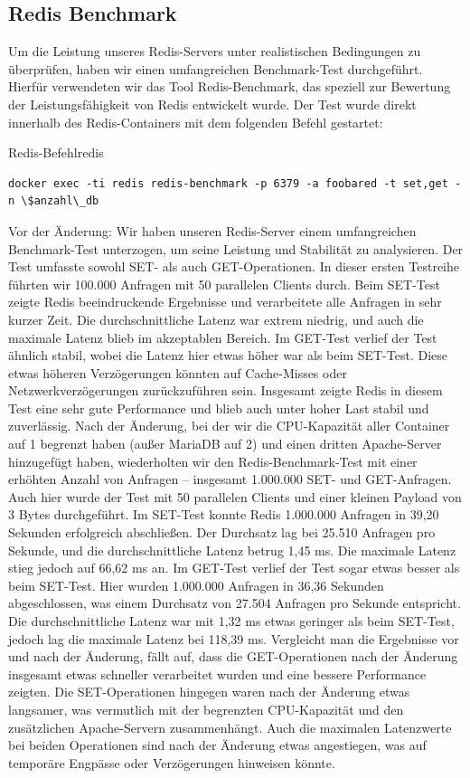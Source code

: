 \subsection{Redis Benchmark}

Um die Leistung unseres Redis-Servers unter realistischen Bedingungen zu überprüfen, haben wir einen umfangreichen Benchmark-Test durchgeführt. Hierfür verwendeten wir das Tool Redis-Benchmark, das speziell zur Bewertung der Leistungsfähigkeit von Redis entwickelt wurde. Der Test wurde direkt innerhalb des Redis-Containers mit dem folgenden Befehl gestartet:

\begin{code}{Redis-Befehl}{redis}
        \begin{verbatim}
docker exec -ti redis redis-benchmark -p 6379 -a foobared -t set,get -n \$anzahl\_db
  \end{verbatim}
\end{code}

Vor der Änderung: Wir haben unseren Redis-Server einem umfangreichen Benchmark-Test unterzogen, um seine Leistung und Stabilität zu analysieren. Der Test umfasste sowohl SET- als auch GET-Operationen. In dieser ersten Testreihe führten wir 100.000 Anfragen mit 50 parallelen Clients durch. Beim SET-Test zeigte Redis beeindruckende Ergebnisse und verarbeitete alle Anfragen in sehr kurzer Zeit. Die durchschnittliche Latenz war extrem niedrig, und auch die maximale Latenz blieb im akzeptablen Bereich. Im GET-Test verlief der Test ähnlich stabil, wobei die Latenz hier etwas höher war als beim SET-Test. Diese etwas höheren Verzögerungen könnten auf Cache-Misses oder Netzwerkverzögerungen zurückzuführen sein. Insgesamt zeigte Redis in diesem Test eine sehr gute Performance und blieb auch unter hoher Last stabil und zuverlässig.
Nach der Änderung, bei der wir die CPU-Kapazität aller Container auf 1 begrenzt haben (außer MariaDB auf 2) und einen dritten Apache-Server hinzugefügt haben, wiederholten wir den Redis-Benchmark-Test mit einer erhöhten Anzahl von Anfragen – insgesamt 1.000.000 SET- und GET-Anfragen. Auch hier wurde der Test mit 50 parallelen Clients und einer kleinen Payload von 3 Bytes durchgeführt. Im SET-Test konnte Redis 1.000.000 Anfragen in 39,20 Sekunden erfolgreich abschließen. Der Durchsatz lag bei 25.510 Anfragen pro Sekunde, und die durchschnittliche Latenz betrug 1,45 ms. Die maximale Latenz stieg jedoch auf 66,62 ms an. Im GET-Test verlief der Test sogar etwas besser als beim SET-Test. Hier wurden 1.000.000 Anfragen in 36,36 Sekunden abgeschlossen, was einem Durchsatz von 27.504 Anfragen pro Sekunde entspricht. Die durchschnittliche Latenz war mit 1,32 ms etwas geringer als beim SET-Test, jedoch lag die maximale Latenz bei 118,39 ms.
Vergleicht man die Ergebnisse vor und nach der Änderung, fällt auf, dass die GET-Operationen nach der Änderung insgesamt etwas schneller verarbeitet wurden und eine bessere Performance zeigten. Die SET-Operationen hingegen waren nach der Änderung etwas langsamer, was vermutlich mit der begrenzten CPU-Kapazität und den zusätzlichen Apache-Servern zusammenhängt. Auch die maximalen Latenzwerte bei beiden Operationen sind nach der Änderung etwas angestiegen, was auf temporäre Engpässe oder Verzögerungen hinweisen könnte.


